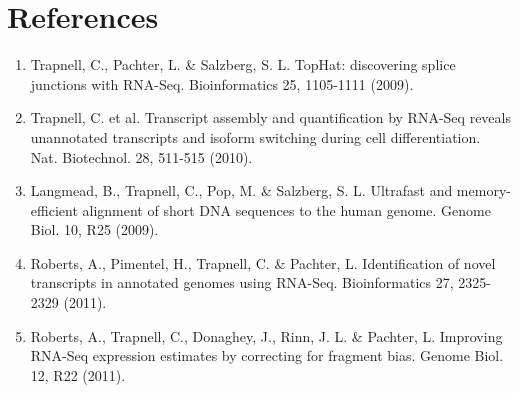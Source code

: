 \section{References}
\begin{enumerate}
  \item Trapnell, C., Pachter, L. \& Salzberg, S. L. TopHat: discovering splice
  junctions with RNA-Seq. Bioinformatics 25, 1105-1111 (2009).
  \item Trapnell, C. et al. Transcript assembly and quantification by RNA-Seq
  reveals unannotated transcripts and isoform switching during cell
  differentiation. Nat. Biotechnol. 28, 511-515 (2010).
  \item Langmead, B., Trapnell, C., Pop, M. \& Salzberg, S. L. Ultrafast and
  memory-efficient alignment of short DNA sequences to the human genome.
  Genome Biol. 10, R25 (2009).
  \item Roberts, A., Pimentel, H., Trapnell, C. \& Pachter, L. Identification
  of novel transcripts in annotated genomes using RNA-Seq. Bioinformatics 27,
  2325-2329 (2011).
  \item Roberts, A., Trapnell, C., Donaghey, J., Rinn, J. L. \& Pachter, L.
  Improving RNA-Seq expression estimates by correcting for fragment bias.
  Genome Biol. 12, R22 (2011).
\end{enumerate}
